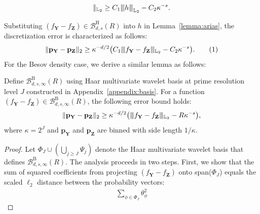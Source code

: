 \documentclass[twoside,11pt]{article}
\newcommand\numberthis{\addtocounter{equation}{1}\tag{\theequation}}
\newcommand{\Ell}{\mathbb{L}}
\newcommand{\EllTwo}{\Ell_2} %
\newcommand{\vertiii}[1]{
	{\left\vert\kern-0.25ex\left\vert\kern-0.25ex\left\vert #1 
		\right\vert\kern-0.25ex\right\vert\kern-0.25ex\right\vert}
}%
\newcommand{\rvTwo}{Y}
\newcommand{\rvThree}{Z}
\newcommand{\vectorize}[1]{\mathbf{#1}}
\newcommand{\dimDensity}{d} %
\newcommand{\probVec}{\mathbf{p}} %
\newcommand{\smoothness}{s}
\newcommand{\ballRadius}{R}
\newcommand{\binNum}{\kappa}           %
\newcommand{\wavFatherFunc}{\phi}
\newcommand{\coef}{\theta}
\newcommand{\resLev}{j}
\newcommand{\primResLev}{J}
\newcommand{\ballDistn}{\mathcal{B}}
\newcommand{\besovBall}[2]{\ballDistn_{\dimDensity,\smoothness, #2}^{\mathrm{B}}(\ballRadius)}
\newcommand{\holderBall}{\ballDistn_{\dimDensity, \smoothness}^{\mathrm{H}}(\ballRadius)} %
\begin{document}
\begin{appendix}
\begin{lemma}
\begin{align*}
			\vert\kern-0.25ex
			\vert_{\EllTwo}
			\geq
			C_1 \vertiii{h}_{\EllTwo}-C_2 \binNum^{-s}.
		\end{align*}
	\end{lemma}
	\noindent
	Substituting
	$(f_{\vectorize{Y}} - f_{\vectorize{Z}}) \in \holderBall $ into $h$ in Lemma~\ref{lemma:arias}, the discretization error is characterized as follows:
	\begin{align*}
		\|\probVec_{\vectorize{\rvTwo}}- \probVec_{\vectorize{\rvThree}}\|_2
		\geq
		\binNum^{-\dimDensity/2}
		\bigl(
		C_1
		\vert\kern-0.25ex
		\vert\kern-0.25ex
		\vert
		f_{\vectorize{Y}} - f_{\vectorize{Z}}
		\vert\kern-0.25ex
		\vert\kern-0.25ex
		\vert_{\EllTwo}
		-
		C_2 \binNum^{-\smoothness}
		\bigr).
		\numberthis\label{equation:disc_error_holder_utilize}
	\end{align*}
	\noindent
	For the Besov density case, we derive a similar lemma as follows:
	\begin{lemma}\label{lemma:besov_discretization_error}
		Define $\besovBall{}{\infty}$ using Haar multivariate wavelet basis at prime resolution level $\primResLev$ constructed in Appendix~\ref{appendix:basis}.
		For a function $(f_{\vectorize{Y}} - f_{\vectorize{Z}}) \in \besovBall{}{\infty}$,   the following error bound holds:
		\begin{equation}\label{equation:disc_error_besov_utilize}
			\|\probVec_{\vectorize{\rvTwo}}- \probVec_{\vectorize{\rvThree}}\|_2
			\geq
			\binNum^{-\dimDensity/2}
			\bigl(
			\vert\kern-0.25ex
			\vert\kern-0.25ex
			\vert
			f_{\vectorize{Y}} - f_{\vectorize{Z}}
			\vert\kern-0.25ex
			\vert\kern-0.25ex
			\vert_{\EllTwo}
			-
			\ballRadius \binNum^{-\smoothness}
			\bigr),
		\end{equation}
		where $\kappa = 2^\primResLev$ and $\probVec_{\vectorize{\rvTwo}}$ and $\probVec_{\vectorize{\rvThree}}$ are binned with side length $1/\kappa$.
	\end{lemma}
	\begin{proof}
		Let $\Phi_{\primResLev}
		\cup
		(
		\bigcup_{\resLev \geq \primResLev}
		\Psi_\resLev
		)$ denote the  Haar multivariate wavelet basis that defines $ \besovBall{2}{\infty}$.
		The analysis proceeds in two steps. First, we show that the sum of squared coefficients from projecting $(f_{\vectorize{Y}} - f_{\vectorize{Z}})$ onto span($\Phi_{\primResLev}$) equals the scaled $\ell_2$ distance between the probability vectors:
		\begin{align*}
			\sum_{\phi \in \Phi_{\primResLev}}
			\coef^2_\wavFatherFunc

\end{align*}
\end{proof}
\end{appendix}
\end{document}
